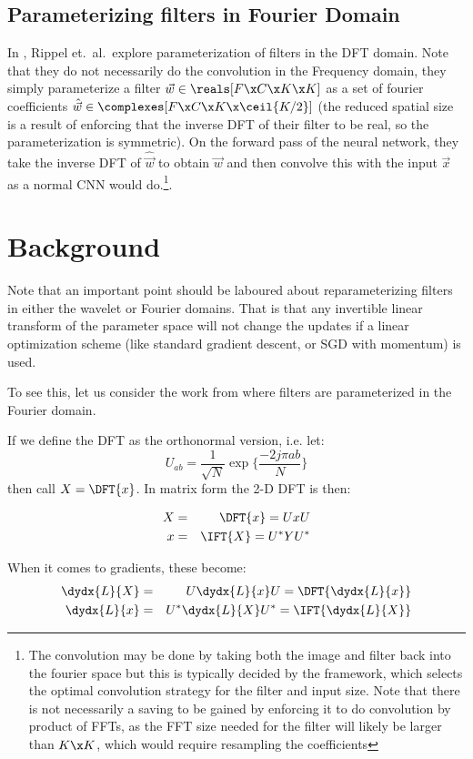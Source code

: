 \subsection{Parameterizing filters in Fourier Domain}
In  \cite{rippel_spectral_2015}, Rippel et.\
al.\ explore parameterization of filters in the DFT domain.  Note that they do
not necessarily do the convolution in the Frequency
domain, they simply parameterize a filter $\vec{w} \in \reals[F\x C\x K\x K]$ as
a set of fourier coefficients $\hat{\vec{w}} \in \complexes[F\x C\x K \x \ceil{K/2}]$
(the reduced spatial size is a result of enforcing that the inverse DFT of their
filter to be real, so the parameterization is symmetric). On the forward pass of
the neural network, they take the inverse DFT of $\hat{\vec{w}}$ to obtain
$\vec{w}$ and then convolve this with the input $\vec{x}$ as a normal CNN
would do.\footnote{The convolution may be done by taking both the image and
filter back into the fourier space but this is typically decided by the
framework, which selects the optimal convolution strategy for the filter and
input size. Note that there is not necessarily a saving to be gained by
enforcing it to do convolution by product of FFTs, as the FFT size needed for
the filter will likely be larger than $K\x K$, which would require resampling
the coefficients}. 

\section{Background}
Note that an important point should be laboured about reparameterizing filters
in either the wavelet or Fourier domains. That is that any invertible linear
transform of the parameter space will not change the updates if a linear
optimization scheme (like standard gradient descent, or SGD with momentum) is
used.

To see this, let us consider the work from \cite{rippel_spectral_2015} where
filters are parameterized in the Fourier domain. 

If we define the DFT as the orthonormal version, i.e. let:
$$ U_{ab} = \frac{1}{\sqrt{N}} \exp\{ \frac{-2j\pi ab}{N} \} $$
%
then call $X = \DFT{x}$. In matrix form the 2-D DFT is then:

\begin{eqnarray}
  X &=& \DFT{x} = UxU \\
  x &=& \IFT{X} = U^*YU^* 
\end{eqnarray}

When it comes to gradients, these become:
\begin{eqnarray}
  \dydx{L}{X} &=& U \dydx{L}{x} U = \DFT{\dydx{L}{x}} \label{eq:ch6:dft_grad}\\
  \dydx{L}{x} &=& U^* \dydx{L}{X} U^* = \IFT{\dydx{L}{X}}
\end{eqnarray}

